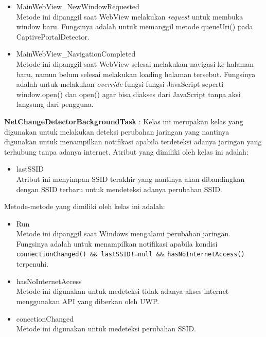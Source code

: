 \documentclass[a4paper,twoside]{article}
\begin{document}
\begin{enumerate}
\begin{itemize}
{\begin{itemize}
                    \item{MainWebView\_NewWindowRequested\\Metode ini dipanggil saat WebView melakukan \textit{request} untuk membuka window baru. Fungsinya adalah untuk memanggil metode queueUri() pada CaptivePortalDetector.}
                    \item{MainWebView\_NavigationCompleted\\Metode ini dipanggil saat WebView selesai melakukan navigasi ke halaman baru, namun belum selesai melakukan loading halaman tersebut. Fungsinya adalah untuk melakukan \textit{override} fungsi-fungsi JavaScript seperti window.open() dan open() agar bisa diakses dari JavaScript tanpa aksi langsung dari pengguna.}
                \end{itemize}
                
                \textbf{NetChangeDetectorBackgroundTask} : Kelas ini merupakan kelas yang digunakan untuk melakukan deteksi perubahan jaringan yang nantinya digunakan untuk menampilkan notifikasi apabila terdeteksi adanya jaringan yang terhubung tanpa adanya internet. Atribut yang dimiliki oleh kelas ini adalah:
                \begin{itemize}
                    \item{lastSSID\\Atribut ini menyimpan SSID terakhir yang nantinya akan dibandingkan dengan SSID terbaru untuk mendeteksi adanya perubahan SSID.}
                \end{itemize}
                Metode-metode yang dimiliki oleh kelas ini adalah:
                \begin{itemize}
                    \item{Run\\Metode ini dipanggil saat Windows mengalami perubahan jaringan. Fungsinya adalah untuk menampilkan notifikasi apabila kondisi \texttt{connectionChanged() \&\& lastSSID!=null \&\& hasNoInternetAccess()} terpenuhi.}
                    \item{hasNoInternetAccess\\Metode ini digunakan untuk medeteksi tidak adanya akses internet menggunakan API yang diberkan oleh UWP.}
                    \item{conectionChanged\\Metode ini digunakan untuk medeteksi perubahan SSID.}
                \end{itemize}
                
}
\end{itemize}
\end{enumerate}
\end{document}

